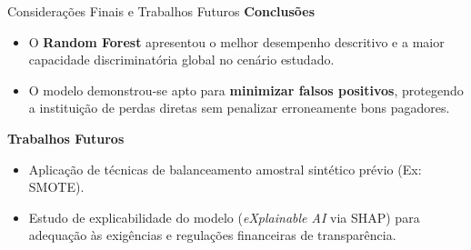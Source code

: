\documentclass[aspectratio=169]{beamer}
\begin{document}
\begin{frame}{Considerações Finais e Trabalhos Futuros}
    \textbf{Conclusões}
    \begin{itemize}
        \item O \textbf{Random Forest} apresentou o melhor desempenho descritivo e a maior capacidade discriminatória global no cenário estudado.
        \item O modelo demonstrou-se apto para \textbf{minimizar falsos positivos}, protegendo a instituição de perdas diretas sem penalizar erroneamente bons pagadores.
    \end{itemize}
    \vspace{0.5cm}
    
    \textbf{Trabalhos Futuros}
    \begin{itemize}
        \item Aplicação de técnicas de balanceamento amostral sintético prévio (Ex: SMOTE).
        \item Estudo de explicabilidade do modelo (\textit{eXplainable AI} via SHAP) para adequação às exigências e regulações financeiras de transparência.
    \end{itemize}
\end{frame}
\end{document}
